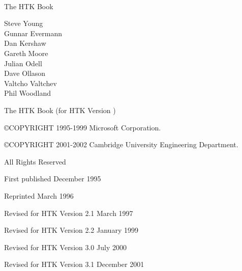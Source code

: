 \documentclass[a4paper,oneside]{book}
\begin{document}
\newlength{\saveindent}
\setlength{\saveindent}{\parindent}



{ \Large \ \\

\vspace{1cm}

\noindent The HTK Book

\vspace{1cm}

\noindent Steve Young \\
\noindent Gunnar Evermann \\
\noindent Dan Kershaw \\
\noindent Gareth Moore \\
\noindent Julian Odell \\
\noindent Dave Ollason \\
\noindent Valtcho Valtchev \\
\noindent Phil Woodland \\

\vspace{1cm}

\noindent The HTK Book (for HTK Version \version)

\vspace{1.5cm}

\noindent \copyright COPYRIGHT 1995-1999 Microsoft Corporation. 

\noindent \copyright COPYRIGHT 2001-2002 Cambridge University Engineering Department. 

\vspace{0.2cm}

\noindent All Rights Reserved

\vspace{1.5cm}

\noindent First published December 1995
\vspace{0.2cm}

\noindent Reprinted March 1996 
\vspace{0.2cm}

\noindent Revised for HTK Version 2.1 March 1997 
\vspace{0.2cm}

\noindent Revised for HTK Version 2.2 January 1999 
\vspace{0.2cm}

\noindent Revised for HTK Version 3.0 July 2000 
\vspace{0.2cm}

\noindent Revised for HTK Version 3.1 December 2001
\vspace{0.2cm}

}
\end{document}
